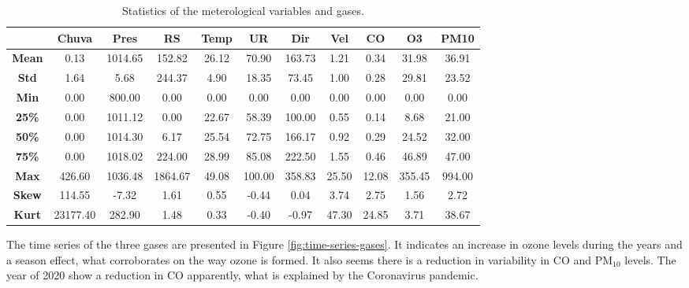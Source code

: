 \begin{table*}[t]
    \centering
    \begin{tabular}{|c|c|c|c|c|c|c|c|c|c|c|}
        \hline
        {} & {\bf Chuva} &  {\bf Pres} & {\bf RS} & {\bf Temp} & {\bf UR} &
        {\bf Dir} & {\bf Vel} & {\bf CO} & {\bf O3} & {\bf PM10} \\
        \hline
        {\bf Mean}  &       0.13 &    1014.65 &     152.82 &      26.12 &      70.90
        &     163.73 &       1.21 &       0.34 &      31.98 &      36.91 \\
        \hline
        {\bf Std}   &       1.64 &       5.68 &     244.37 &       4.90 &      18.35
        &      73.45 &       1.00 &       0.28 &      29.81 &      23.52 \\
        \hline
        {\bf Min}   &       0.00 &     800.00 &       0.00 &       0.00 &       0.00
        &       0.00 &       0.00 &       0.00 &       0.00 &       0.00 \\
        \hline
        {\bf 25\%}   &       0.00 &    1011.12 &       0.00 &      22.67 &
        58.39 &     100.00 &       0.55 &       0.14 &       8.68 &      21.00
        \\
        \hline
        {\bf 50\%}   &       0.00 &    1014.30 &       6.17 &      25.54 &
        72.75 &     166.17 &       0.92 &       0.29 &      24.52 &      32.00
        \\
        \hline
        {\bf 75\%}   &       0.00 &    1018.02 &     224.00 &      28.99 &
        85.08 &     222.50 &       1.55 &       0.46 &      46.89 &      47.00
        \\
        \hline
        {\bf Max}   &     426.60 &    1036.48 &    1864.67 &      49.08 &     100.00
        &     358.83 &      25.50 &      12.08 &     355.45 &     994.00 \\
        \hline
        {\bf Skew}  &     114.55 &      -7.32 &       1.61 &       0.55 &      -0.44
        &       0.04 &       3.74 &       2.75 &       1.56 &       2.72 \\
        \hline
        {\bf Kurt}  &   23177.40 &     282.90 &       1.48 &       0.33 &      -0.40
        &      -0.97 &      47.30 &      24.85 &       3.71 &      38.67 \\
        \hline
    \end{tabular}
    \caption{Statistics of the meterological variables and gases.}
    \label{tab:statistics-variables}
\end{table*}


The time series of the three gases are presented in Figure
\ref{fig:time-series-gases}. It indicates an increase in ozone levels during the
years and a season effect, what corroborates on the way ozone is formed.  It
also seems there is a reduction in variability in CO and PM$_{10}$ levels. The
year of 2020 show a reduction in CO apparently, what is explained by the
Coronavirus pandemic. 

